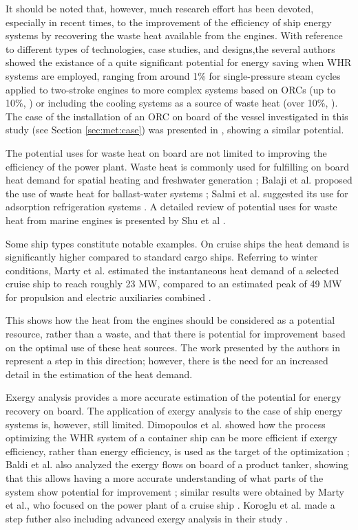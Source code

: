 \documentclass[preprint,12pt]{elsarticle}
\begin{document}
It should be noted that, however, much research effort has been devoted, especially in recent times, to the improvement of the efficiency of ship energy systems by recovering the waste heat available from the engines. With reference to different types of technologies, case studies, and designs,the several authors showed the existance of a quite significant potential for energy saving when WHR systems are employed, ranging from around 1\% for single-pressure steam cycles applied to two-stroke engines \cite{Theotokatos2012} to more complex systems based on ORCs (up to 10\%, \cite{Hountalas2012}) or including the cooling systems as a source of waste heat (over 10\%, \cite{Dimopoulos2012}).  The case of the installation of an ORC on board of the vessel investigated in this study (see Section \ref{sec:met:case}) was presented in \cite{Mondejar2015}, showing a similar potential.

The potential uses for waste heat on board are not limited to improving the efficiency of the power plant. Waste heat is commonly used for fulfilling on board heat demand for spatial heating and freshwater generation \cite{Molland2011,Baldi2015a,Mccarthy1990};  Balaji et al. proposed the use of waste heat for ballast-water systems \cite{Balaji2012}; Salmi et al. suggested its use for adsorption refrigeration systems \cite{Salmi2017}. A detailed review of potential uses for waste heat from marine engines is presented by Shu et al \cite{Shu2013}. 

Some ship types constitute notable examples. On cruise ships the heat demand is significantly higher compared to standard cargo ships. Referring to winter conditions, Marty et al. estimated the instantaneous heat demand of a selected cruise ship to reach roughly 23 MW, compared to an estimated peak of 49 MW for propulsion and electric auxiliaries combined \cite{Marty2012}.  


This shows how the heat from the engines should be considered as a potential resource, rather than a waste, and that there is potential for improvement based on the optimal use of these heat sources. The work presented by the authors in \cite{Baldi2016} represent a step in this direction; however, there is the need for an increased detail in the estimation of the heat demand. 

Exergy analysis provides a more accurate estimation of the potential for energy recovery on board. The application of exergy analysis to the case of ship energy systems is, however, still limited. Dimopoulos et al. showed how the process optimizing the WHR system of a container ship can be more efficient if exergy efficiency, rather than energy efficiency, is used as the target of the optimization \cite{Dimopoulos2012}; Baldi et al. also analyzed the exergy flows on board of a product tanker, showing that this allows having a more accurate understanding of what parts of the system show potential for improvement \cite{Baldi2015a}; similar results were obtained by Marty et al., who focused on the power plant of a cruise ship \cite{Marty2016}. Koroglu et al. made a step futher also including advanced exergy analysis in their study \cite{Koroglu2017}.
\end{document}
